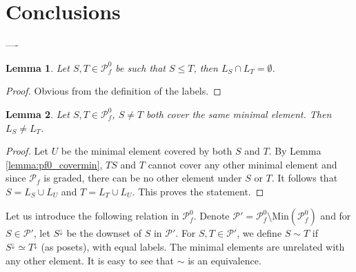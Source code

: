 \documentclass[12pt]{article}
\newtheorem{lemma}{Lemma}
\theoremstyle{definition}
\theoremstyle{remark}
\def\Pe{\mathcal P}
\begin{document}
\section{Conclusions}



%
%
%
%

----
\begin{lemma} Let $S,T\in \Pe_f^0$ be such that $S\le T$, then $L_S\cap L_T=\emptyset$.

\end{lemma}

\begin{proof} Obvious from the definition of the labels.

\end{proof}


\begin{lemma}\label{lemma:labels_cover} Let $S,T\in \Pe_f^0$, $S\ne T$ both cover the same minimal
element. Then $L_S\ne L_T$.

\end{lemma}


\begin{proof} Let $U$ be the minimal element covered by both $S$ and $T$. By Lemma \ref{lemma:pf0_covermin}, 
$TS$ and $T$ cannot cover any other minimal element and since $\Pe_f$ is graded, there can
be no other element under $S$ or $T$. It follows that $S=L_S\cup L_U$ and $T=L_T\cup L_U$.
This proves the statement.


\end{proof}


 
Let us introduce the following relation in $\Pe_f^0$. Denote $\Pe'= \Pe_f^0\setminus \mathrm{Min}(\Pe_f^0)$ and
for $S\in \Pe'$, let $S^\downarrow$ be the downset of $S$ in $\Pe'$.
For $S,T\in \Pe'$, we define $S\sim T$ if
$S^\downarrow\simeq T^\downarrow$ (as posets), with equal labels. The minimal elements are
unrelated with any other element. It is easy to see that $\sim $ is  an equivalence. 
\end{document}
